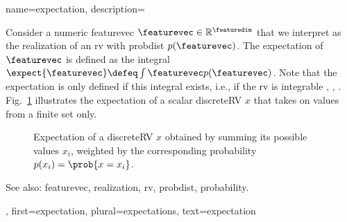 {name={expectation},
	description={Consider a numeric \gls{featurevec} $\featurevec \in \mathbb{R}^{\featuredim}$ 
		that we interpret as the \gls{realization} of an \gls{rv} with \gls{probdist} $p(\featurevec)$. 
		The expectation of $\featurevec$ is defined as the integral $\expect \{ \featurevec \} \defeq \int \featurevec p(\featurevec)$. 
		Note that the expectation is only defined if this integral exists, i.e., if the \gls{rv} is \gls{integrable} 
		\cite{RudinBookPrinciplesMatheAnalysis}, \cite{BillingsleyProbMeasure}, \cite{HalmosMeasure}. 
		Fig.\ \ref{fig_expect_discrete_dict} illustrates the expectation of a scalar \gls{discreteRV} $x$ that takes on values 
		from a finite set only. 
   		\begin{figure}[H]
   			\begin{center}
			\end{center}
			\vspace*{-5mm}
		\caption{Expectation of a \gls{discreteRV} $x$ obtained by summing its possible values $x_{i}$, weighted 
			by the corresponding \gls{probability} $p(x_i) = \prob{x= x_i}$. \label{fig_expect_discrete_dict}}
 		\end{figure}
		See also: \gls{featurevec}, \gls{realization}, \gls{rv}, \gls{probdist}, \gls{probability}.},
	first={expectation},
	plural={expectations},
	text={expectation}
}


